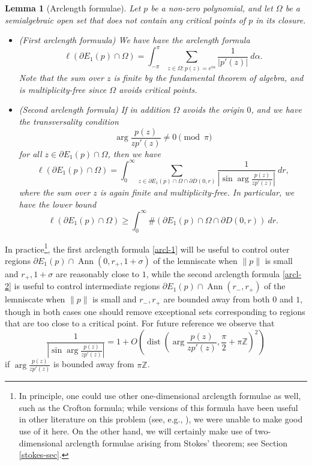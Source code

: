 \documentclass[12pt]{amsart}
\newtheorem{lemma}{Lemma}[section]
\newcommand{\Z}{\mathbb{Z}}
\renewcommand{\arg}{\operatorname{arg}}
\newcommand{\dist}{\operatorname{dist}}
\newcommand{\Ann}{\operatorname{Ann}}
\begin{document}
\begin{lemma}[Arclength formulae]\label{arclength}  Let $p$ be a non-zero polynomial, and let $\Omega$ be a semialgebraic open set that does not contain any critical points of $p$ in its closure.
\begin{itemize}
    \item[(i)] (First arclength formuula) We have have the arclength formula
\begin{equation}\label{arcl-1}
 \ell(\partial E_1(p) \cap \Omega) = \int_{-\pi}^\pi \sum_{z \in \Omega: p(z) = e^{i\alpha}} \frac{1}{|p'(z)|}\ d\alpha.
\end{equation}
Note that the sum over $z$ is finite by the fundamental theorem of algebra, and is multiplicity-free since $\Omega$ avoids critical points.
\item[(ii)] (Second arclength formula)  If in addition $\Omega$ avoids the origin $0$, and we have the transversality condition
\begin{equation}\label{radial}
    \arg \frac{p(z)}{zp'(z)} \neq 0 \pmod \pi
\end{equation}
for all $z \in \partial E_1(p) \cap \Omega$,
then we have
\begin{equation}\label{arcl-2}
 \ell(\partial E_1(p) \cap \Omega) = \int_0^\infty \sum_{z \in \partial E_1(p) \cap \Omega \cap \partial D(0,r)} \frac{1}{\left|\sin \arg \frac{p(z)}{zp'(z)}\right|} \ dr,
\end{equation}
where the sum over $z$ is again finite and multiplicity-free. In particular, we have the lower bound
$$ \ell(\partial E_1(p) \cap \Omega) \geq \int_0^\infty \# (\partial E_1(p) \cap \Omega \cap \partial D(0,r)) \ dr.$$
\end{itemize}
\end{lemma}

In practice\footnote{In principle, one could use other one-dimensional arclength formulae as well, such as the Crofton formula; while versions of this formula have been useful in other literature on this problem (see, e.g., \cite[\S 5]{fryntov}), we were unable to make good use of it here.  On the other hand, we will certainly make use of two-dimensional arclength formulae arising from Stokes' theorem; see Section \ref{stokes-sec}.}, the first arclength formula \eqref{arcl-1} will be useful to control outer regions $\partial E_1(p) \cap \Ann(0,r_+,1+\sigma)$ of the lemniscate when $\|p\|$ is small and $r_+, 1+\sigma$ are reasonably close to $1$, while the second arclength formula \eqref{arcl-2} is useful to control intermediate regions $\partial E_1(p) \cap \Ann(r_-, r_+)$ of the lemniscate when $\|p\|$ is small and $r_-, r_+$ are bounded away from both $0$ and $1$, though in both cases one should remove exceptional sets corresponding to regions that are too close to a critical point.  For future reference we observe that
\begin{equation}\label{cosec-asym}
\frac{1}{\left|\sin \arg \frac{p(z)}{zp'(z)}\right|} = 1 + O\left( \dist\left(\arg \frac{p(z)}{zp'(z)},\frac{\pi}{2} + \pi \Z \right)^2 \right)
\end{equation}
if $\arg \frac{p(z)}{zp'(z)}$ is bounded away from $\pi \Z$.
\end{document}
